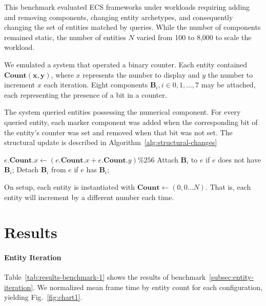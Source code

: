 \documentclass[conference]{IEEEtran}
\begin{document}
    This benchmark evaluated ECS frameworks under workloads requiring adding and removing components,
    changing entity archetypes, and consequently changing the set of entities
    matched by queries.
    While the number of components remained static, the number
    of entities $N$ varied from 100 to 8,000 to scale the workload.

    We emulated a system that operated a binary counter.
    Each entity contained $\mathbf{Count(x,y)}$, where $x$ represents the number to display
    and $y$ the number to increment $x$ each iteration.
    Eight components $\mathbf{B}_i, i \in {0,1,\ldots,7}$ may be attached, each representing the presence of a bit in a counter.

    The system queried entities possessing the numerical component.
    For every queried entity, each marker component was added when the corresponding bit of
    the entity's counter was set and removed when that bit was not set.
    The structural update is described in Algorithm~\ref{alg:structural-changes}

    \begin{algorithm}[h]
        \caption{Structural Changes}
        \label{alg:structural-changes}
        {
            $e.\mathbf{Count}.x \gets (e.\mathbf{Count}.x + e.\mathbf{Count}.y) \% 256 $
            {
                {
                    Attach $\mathbf{B}_i$ to $e$ if $e$ does not have $\mathbf{B}_i$;
                }
                {
                    Detach $\mathbf{B}_i$ from $e$ if $e$ has $\mathbf{B}_i$;
                }
            }
        }
    \end{algorithm}

    On setup, each entity is instantiated with $\mathbf{Count} \gets (0, 0 \dots N)$.
    That is, each entity will increment by a different number each time.

    \section{Results}
    \label{sec:results}

    \paragraph*{Entity Iteration}Table~\ref{tab:results-benchmark-1} shows the results of benchmark~\ref{subsec:entity-iteration}.
    We normalized mean frame time by entity count for each configuration, yielding Fig.~\ref{fig:chart1}.
\end{document}
